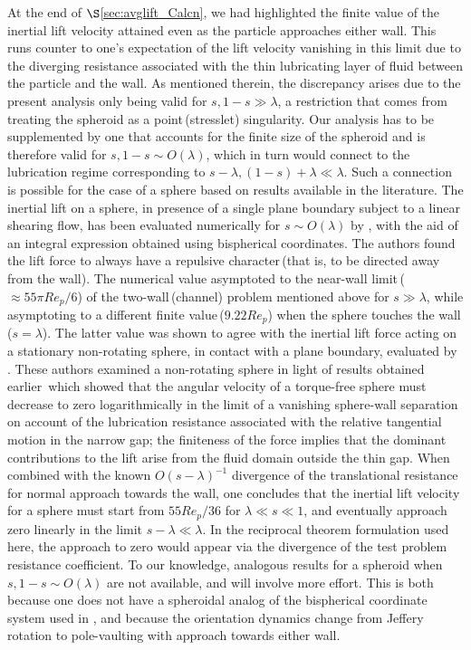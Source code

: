 \documentclass{jfm}
\begin{document}
At the end of $\S$\ref{sec:avglift_Calcn}, we had highlighted the finite value of the inertial lift velocity attained even as the particle approaches either wall. This runs counter to one's expectation of the lift velocity vanishing in this limit due to the diverging resistance associated with the thin lubricating  layer of fluid between the particle and the wall. As mentioned therein, the discrepancy arises due to the present analysis only being valid for $s,1-s\gg\lambda$, a restriction that comes from treating the spheroid as a point\,(stresslet) singularity. Our analysis has to be supplemented by one that accounts for the finite size of the spheroid and is therefore valid for $s,1-s \sim O(\lambda)$, which in turn would connect to the lubrication regime corresponding to $s-\lambda,(1-s)+\lambda\ll\lambda$. Such a connection is possible for the case of a sphere based on results available in the literature. The inertial lift on a sphere, in presence of a single plane boundary subject to a linear shearing flow, has been evaluated numerically for $s \sim O(\lambda)$ by \cite{cherukat1994}, with the aid of an integral expression obtained using bispherical coordinates. The authors found the lift force to always have a repulsive character\,(that is, to be directed away from the wall). The numerical value asymptoted to the near-wall limit\,($\approx 55\pi Re_p/6$) of the two-wall\,(channel) problem mentioned above for $s\gg\lambda$, while asymptoting to a different finite value\,($9.22 Re_p$) when the sphere touches the wall\,($s=\lambda$). The latter value was shown to agree with the inertial lift force acting on a stationary non-rotating sphere, in contact with a plane boundary, evaluated by \cite{acrivos1985}. These authors examined a non-rotating sphere in light of results obtained earlier\,\citep{goldman1967b} which showed that the angular velocity of a torque-free sphere must decrease to zero logarithmically in the limit of a vanishing sphere-wall separation on account of the lubrication resistance associated with the relative tangential motion in the narrow gap; the finiteness of the force implies that the dominant contributions to the lift arise from the fluid domain outside the thin gap. When combined with the known $O(s-\lambda)^{-1}$ divergence of the translational resistance for normal approach towards the wall, one concludes that the inertial lift velocity for a sphere must start from $55 Re_p/36$ for $\lambda \ll s \ll 1$, and eventually approach zero linearly in the limit $s-\lambda \ll \lambda$. In the reciprocal theorem formulation used here, the approach to zero would appear via the divergence of the test problem resistance coefficient. To our knowledge, analogous results for a spheroid when $s, 1-s \sim O(\lambda)$ are not available, and will involve more effort. This is both because one does not have a spheroidal analog of the bispherical coordinate system used in \cite{cherukat1994}, and because the orientation dynamics change from Jeffery rotation to pole-vaulting with approach towards either wall. 
\end{document}
